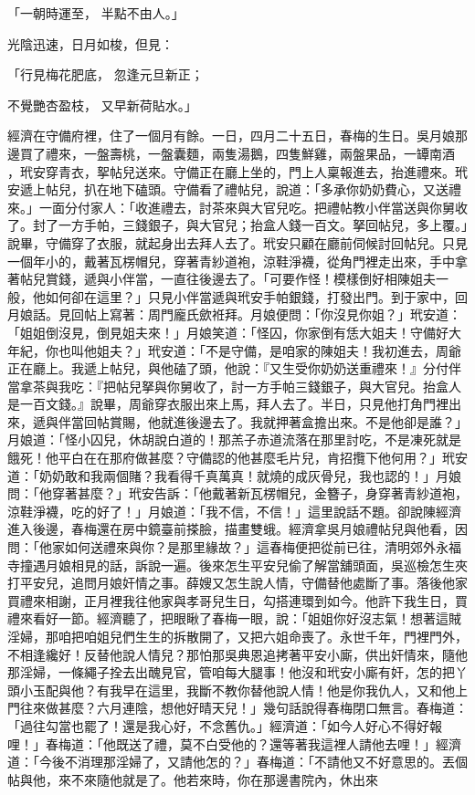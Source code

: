 \begin{showcontents}{}
「一朝時運至，  半點不由人。」

光陰迅速，日月如梭，但見：

「行見梅花肥底，  忽逢元旦新正；

不覺艷杏盈枝，  又早新荷貼水。」

經濟在守備府裡，住了一個月有餘。一日，四月二十五日，春梅的生日。吳月娘那邊買了禮來，一盤壽桃，一盤囊麵，兩隻湯鵝，四隻鮮雞，兩盤果品，一罈南酒 ，玳安穿青衣，挐帖兒送來。守備正在廳上坐的，門上人稟報進去，抬進禮來。玳安遞上帖兒，扒在地下磕頭。守備看了禮帖兒，說道：「多承你奶奶費心，又送禮來。」一面分付家人：「收進禮去，討茶來與大官兒吃。把禮帖教小伴當送與你舅收了。封了一方手帕，三錢銀子，與大官兒；抬盒人錢一百文。拏回帖兒，多上覆。」說畢，守備穿了衣服，就起身出去拜人去了。玳安只顧在廳前伺候討回帖兒。只見一個年小的，戴著瓦楞帽兒，穿著青紗道袍，涼鞋淨襪，從角門裡走出來，手中拿著帖兒賞錢，遞與小伴當，一直往後邊去了。「可要作怪！模樣倒好相陳姐夫一般，他如何卻在這里？」只見小伴當遞與玳安手帕銀錢，打發出門。到于家中，回月娘話。見回帖上寫著：周門龐氏歛袵拜。月娘便問：「你沒見你姐？」玳安道：「姐姐倒沒見，倒見姐夫來！」月娘笑道：「怪囚，你家倒有恁大姐夫！守備好大年紀，你也叫他姐夫？」玳安道：「不是守備，是咱家的陳姐夫！我初進去，周爺正在廳上。我遞上帖兒，與他磕了頭，他說：『又生受你奶奶送重禮來！』分付伴當拿茶與我吃：『把帖兒拏與你舅收了，討一方手帕三錢銀子，與大官兒。抬盒人是一百文錢。』說畢，周爺穿衣服出來上馬，拜人去了。半日，只見他打角門裡出來，遞與伴當回帖賞賜，他就進後邊去了。我就押著盒擔出來。不是他卻是誰？」月娘道：「怪小囚兒，休胡說白道的！那羔子赤道流落在那里討吃，不是凍死就是餓死！他平白在在那府做甚麼？守備認的他甚麼毛片兒，肯招攬下他何用？」玳安道：「奶奶敢和我兩個賭？我看得千真萬真！就燒的成灰骨兒，我也認的！」月娘問：「他穿著甚麼？」玳安告訴：「他戴著新瓦楞帽兒，金簪子，身穿著青紗道袍，涼鞋淨襪，吃的好了！」月娘道：「我不信，不信！」這里說話不題。卻說陳經濟進入後邊，春梅還在房中鏡臺前搽臉，描畫雙蛾。經濟拿吳月娘禮帖兒與他看，因問：「他家如何送禮來與你？是那里緣故？」這春梅便把從前已往，清明郊外永福寺撞遇月娘相見的話，訴說一遍。後來怎生平安兒偷了解當舖頭面，吳巡檢怎生夾打平安兒，追問月娘奸情之事。薛嫂又怎生說人情，守備替他處斷了事。落後他家買禮來相謝，正月裡我往他家與孝哥兒生日，勾搭連環到如今。他許下我生日，買禮來看好一節。經濟聽了，把眼瞅了春梅一眼，說：「姐姐你好沒志氣！想著這賊淫婦，那咱把咱姐兒們生生的拆散開了，又把六姐命喪了。永世千年，門裡門外，不相逢纔好！反替他說人情兒？那怕那吳典恩追拷著平安小廝，供出奸情來，隨他那淫婦，一條繩子拴去出醜見官，管咱每大腿事！他沒和玳安小廝有奸，怎的把丫頭小玉配與他？有我早在這里，我斷不教你替他說人情！他是你我仇人，又和他上門往來做甚麼？六月連陰，想他好晴天兒！」幾句話說得春梅閉口無言。春梅道：「過往勾當也罷了！還是我心好，不念舊仇。」經濟道：「如今人好心不得好報哩！」春梅道：「他既送了禮，莫不白受他的？還等著我這裡人請他去哩！」經濟道：「今後不消理那淫婦了，又請他怎的？」春梅道：「不請他又不好意思的。丟個帖與他，來不來隨他就是了。他若來時，你在那邊書院內，休出來
\end{showcontents}
